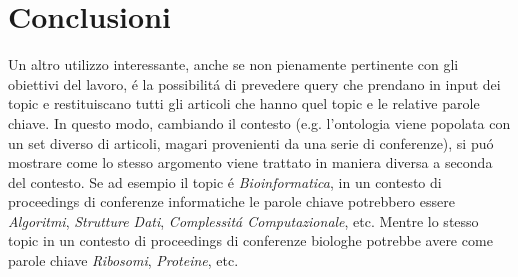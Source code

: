 \documentclass[11pt,a4paper]{article}
\begin{document}
\section{Conclusioni}
\label{sec:conclusions}
Un altro utilizzo interessante, anche se non pienamente pertinente con gli obiettivi del lavoro, \'e la possibilit\'a di prevedere query che prendano in input dei topic e restituiscano tutti gli articoli che hanno quel topic e le relative parole chiave. In questo modo, cambiando il contesto (e.g. l'ontologia viene popolata con un set diverso di articoli, magari provenienti da una serie di conferenze), si pu\'o mostrare come lo stesso argomento viene trattato in maniera diversa a seconda del contesto. Se ad esempio il topic \'e \emph{Bioinformatica}, in un contesto di proceedings di conferenze informatiche le parole chiave potrebbero essere \emph{Algoritmi}, \emph{Strutture Dati}, \emph{Complessit\'a Computazionale}, etc. Mentre lo stesso topic in un contesto di proceedings di conferenze biologhe potrebbe avere come parole chiave \emph{Ribosomi}, \emph{Proteine}, etc. 
\end{document}
